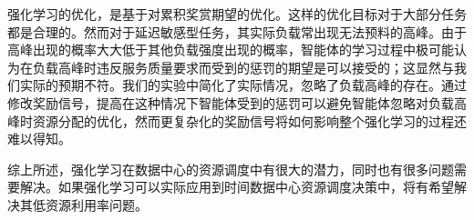 强化学习的优化，是基于对累积奖赏期望的优化。这样的优化目标对于大部分任务都是合理的。然而对于延迟敏感型任务，其实际负载常出现无法预料的高峰。由于高峰出现的概率大大低于其他负载强度出现的概率，智能体的学习过程中极可能认为在负载高峰时违反服务质量要求而受到的惩罚的期望是可以接受的；这显然与我们实际的预期不符。我们的实验中简化了实际情况，忽略了负载高峰的存在。通过修改奖励信号，提高在这种情况下智能体受到的惩罚可以避免智能体忽略对负载高峰时资源分配的优化，然而更复杂化的奖励信号将如何影响整个强化学习的过程还难以得知。

综上所述，强化学习在数据中心的资源调度中有很大的潜力，同时也有很多问题需要解决。如果强化学习可以实际应用到时间数据中心资源调度决策中，将有希望解决其低资源利用率问题。
